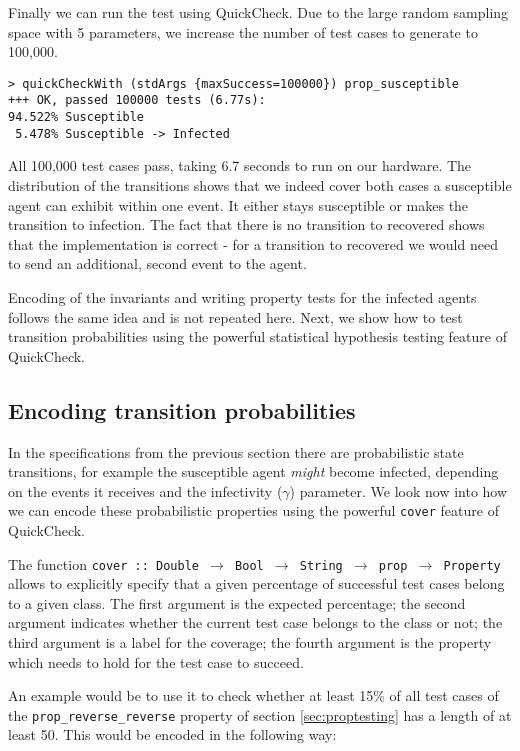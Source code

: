 Finally we can run the test using QuickCheck. Due to the large random sampling space with 5 parameters, we increase the number of test cases to generate to 100,000.

\begin{footnotesize}
\begin{verbatim}
> quickCheckWith (stdArgs {maxSuccess=100000}) prop_susceptible
+++ OK, passed 100000 tests (6.77s):
94.522% Susceptible
 5.478% Susceptible -> Infected
\end{verbatim}
\end{footnotesize}

All 100,000 test cases pass, taking 6.7 seconds to run on our hardware. The distribution of the transitions shows that we indeed cover both cases a susceptible agent can exhibit within one event. It either stays susceptible or makes the transition to infection. The fact that there is no transition to recovered shows that the implementation is correct - for a transition to recovered we would need to send an additional, second event to the agent.

Encoding of the invariants and writing property tests for the infected agents follows the same idea and is not repeated here. Next, we show how to test transition probabilities using the powerful statistical hypothesis testing feature of QuickCheck.

\subsection{Encoding transition probabilities}
In the specifications from the previous section there are probabilistic state transitions, for example the susceptible agent \textit{might} become infected, depending on the events it receives and the infectivity ($\gamma$) parameter. We look now into how we can encode these probabilistic properties using the powerful \texttt{cover} feature of QuickCheck.

The function \texttt{cover :: Double $\rightarrow$ Bool $\rightarrow$ String $\rightarrow$ prop $\rightarrow$ Property} allows to explicitly specify that a given percentage of successful test cases belong to a given class. The first argument is the expected percentage; the second argument indicates whether the current test case belongs to the class or not; the third argument is a label for the coverage; the fourth argument is the property which needs to hold for the test case to succeed.

An example would be to use it to check whether at least 15\% of all test cases of the \texttt{prop\_reverse\_reverse} property of section \ref{sec:proptesting} has a length of at least 50. This would be encoded in the following way:

